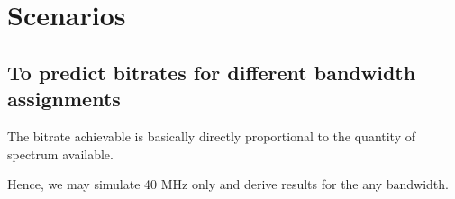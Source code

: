 \section{Scenarios}
\label{sec:scenarios}






\subsection*{To predict bitrates for different bandwidth assignments}



The bitrate achievable is basically directly proportional to the quantity of spectrum available. 




Hence, we may simulate 40 MHz only and derive results for the any bandwidth.
